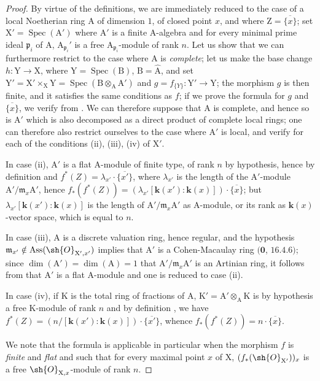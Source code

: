 \begin{proof}
By virtue of the definitions, we are immediately reduced to the case of a local Noetherian ring $\mathrm{A}$ of dimension $1$, of closed point $x$, and where $\mathrm{Z}=\overline{\{x\}}$; set $\mathrm{X}'=\operatorname{Spec}(\mathrm{A}')$ where $\mathrm{A}'$ is a finite A-algebra and for every minimal prime ideal $\mathfrak{p}_i$ of $\mathrm{A}$, $\mathrm{A}_{\mathfrak{p}_i}'$ is a free $\mathrm{A}_{\mathfrak{p}_i}$-module of rank $n$.
Let us show that we can furthermore restrict to the case where $\mathrm{A}$ is \emph{complete}; let us make the base change $h:\mathrm{Y}\to\mathrm{X}$, where $\mathrm{Y}=\operatorname{Spec}(\mathrm{B})$, $\mathrm{B}=\widehat{\mathrm{A}}$, and set $\mathrm{Y}'=\mathrm{X}'\times_{\mathrm{X}}\mathrm{Y}=\operatorname{Spec}(\mathrm{B}\otimes_{\mathrm{A}}\mathrm{A}')$ and $g=f_{\{Y\}}:\mathrm{Y}'\to\mathrm{Y}$; the morphism $g$ is then finite, and it satisfies the same conditions as $f$; if we prove the formula  for $g$ and $\overline{\{x\}}$, we verify from .
We can therefore suppose that $\mathrm{A}$ is complete, and hence so is $\mathrm{A}'$ which is also decomposed as a direct product of complete local rings; one can therefore also restrict ourselves to the case where $\mathrm{A}'$ is local, and verify  for each of the conditions (ii), (iii), (iv) of $\mathrm{X}'$.

In case (ii), $\mathrm{A}'$ is a flat A-module of finite type, of rank $n$ by hypothesis, hence by definition  and  $f^*(Z)=\lambda_{x'}\cdot\overline{\{x'\}}$, where $\lambda_{x'}$ is the length of the $\mathrm{A}'$-module $\mathrm{A}'/\mathfrak{m}_x\mathrm{A}'$, hence $f_*(f^*(Z))=(\lambda_{x'}[\boldsymbol{k}(x'):\boldsymbol{k}(x)])\cdot\overline{\{x\}}$; but $\lambda_{x'}[\boldsymbol{k}(x'):\boldsymbol{k}(x)]$ is the length of $\mathrm{A}'/\mathfrak{m}_x\mathrm{A}'$ as A-module, or its rank as $\boldsymbol{k}(x)$-vector space, which is equal to $n$.

In case (iii), $\mathrm{A}$ is a discrete valuation ring, hence regular, and the hypothesis $\mathfrak{m}_{x'}\notin\operatorname{Ass}(\sh{O}_{\mathrm{X}',x'})$ implies that $\mathrm{A}'$ is a Cohen-Macaulay ring $(\mathbf{0}$, $16.4.6)$; since $\dim(\mathrm{A}')=\dim(\mathrm{A})=1$ that $\mathrm{A}'/\mathfrak{m}_x\mathrm{A}'$ is an Artinian ring, it follows from  that $\mathrm{A}'$ is a flat A-module and one is reduced to case (ii).

In case (iv), if $\mathrm{K}$ is the total ring of fractions of $\mathrm{A}$, $\mathrm{K}'=\mathrm{A}'\otimes_{\mathrm{A}}\mathrm{K}$ is by hypothesis a free $\mathrm{K}$-module of rank $n$ and by definition , we have $f^*(Z)=(n/[\boldsymbol{k}(x'):\boldsymbol{k}(x)])\cdot\overline{\{x'\}}$, whence $f_*(f^*(Z))=n\cdot\overline{\{x\}}$.

We note that the formula  is applicable in particular when the morphism $f$ is \emph{finite} and \emph{flat} and such that for every maximal point $x$ of $\mathrm{X}$, $(f_*(\sh{O}_{\mathrm{X}'}))_x$ is a free $\sh{O}_{\mathrm{X},x}$-module of rank $n$.
\end{proof}

